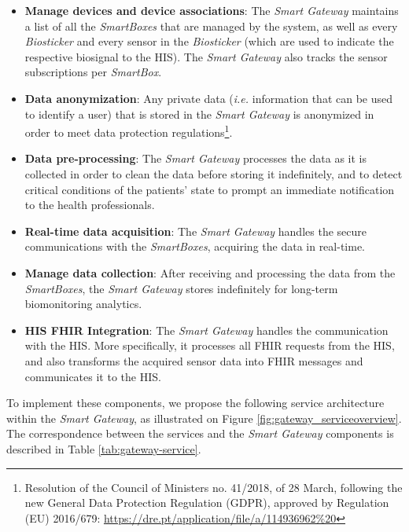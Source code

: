 \begin{itemize}
    \item \textbf{Manage devices and device associations}: The \textit{Smart Gateway} maintains a list of all the \textit{SmartBoxes} that are managed by the system, as well as every \textit{Biosticker} and every sensor in the \textit{Biosticker} (which are used to indicate the respective biosignal to the \acs{HIS}). The \textit{Smart Gateway} also tracks the sensor subscriptions per \textit{SmartBox}.
    \item \textbf{Data anonymization}: Any private data (\textit{i.e.} information that can be used to identify a user) that is stored in the \textit{Smart Gateway} is anonymized in order to meet data protection regulations\footnote{Resolution of the Council of Ministers no. 41/2018, of 28 March, following the new General Data Protection Regulation (GDPR), approved by Regulation (EU) 2016/679:  \url{https://dre.pt/application/file/a/114936962\%20}}. 
    \item \textbf{Data pre-processing}: The \textit{Smart Gateway} processes the data as it is collected in order to clean the data before storing it indefinitely, and to detect critical conditions of the patients' state to prompt an immediate notification to the health professionals.
    \item \textbf{Real-time data acquisition}: The \textit{Smart Gateway} handles the secure communications with the \textit{SmartBoxes}, acquiring the data in real-time.
    \item \textbf{Manage data collection}: After receiving and processing the data from the \textit{SmartBoxes}, the \textit{Smart Gateway} stores indefinitely for long-term biomonitoring analytics.
    \item \textbf{\acs{HIS} \acs{FHIR} Integration}: The \textit{Smart Gateway} handles the communication with the \acs{HIS}. More specifically, it processes all \acs{FHIR} requests from the \acs{HIS}, and also transforms the acquired sensor data into \acs{FHIR} messages and communicates it to the \acs{HIS}. 
\end{itemize}

To implement these components, we propose the following service architecture within the \textit{Smart Gateway}, as illustrated on Figure \ref{fig:gateway_serviceoverview}. The correspondence between the services and the \textit{Smart Gateway} components is described in Table \ref{tab:gateway-service}.

